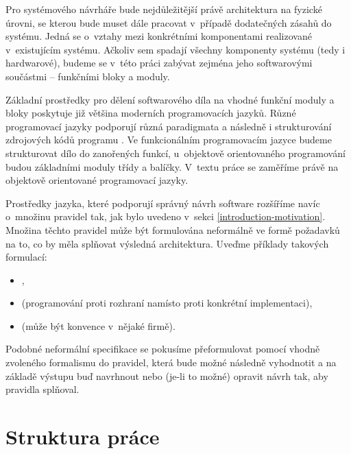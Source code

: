 Pro systémového návrháře bude nejdůležitější právě architektura na fyzické úrovni, se kterou bude muset dále pracovat v~případě dodatečných zásahů do systému. Jedná se o~vztahy mezi konkrétními komponentami realizované v~existujícím systému. Ačkoliv sem spadají všechny komponenty systému (tedy i hardwarové), budeme se v~této práci zabývat zejména jeho softwarovými součástmi -- funkčními bloky a moduly.

Základní prostředky pro dělení softwarového díla na vhodné funkční moduly a bloky poskytuje již většina moderních programovacích jazyků. Různé programovací jazyky podporují různá paradigmata a následně i strukturování zdrojových kódů programu \cite{wiki:programming_paradigm}. Ve funkcionálním programovacím jazyce budeme strukturovat dílo do zanořených funkcí, u~objektově orientovaného programování budou základními moduly třídy a balíčky. V~textu práce se zaměříme právě na objektově orientované programovací jazyky.

Prostředky jazyka, které podporují správný návrh software rozšíříme navíc o~množinu pravidel tak, jak bylo uvedeno v~sekci \ref{introduction-motivation}. Množina těchto pravidel může být formulována neformálně ve formě požadavků na to, co by měla splňovat výsledná architektura. Uveďme příklady takových formulací:

\begin{itemize}
\item {},
\item {} (programování proti rozhraní namísto proti konkrétní implementaci),
\item {} (může být konvence v~nějaké firmě).
\end{itemize}

Podobné neformální specifikace se pokusíme přeformulovat pomocí vhodně zvoleného formalismu do pravidel, která bude možné následně vyhodnotit a na základě výstupu buď navrhnout nebo (je-li to možné) opravit návrh tak, aby pravidla splňoval.

\section{Struktura práce}

